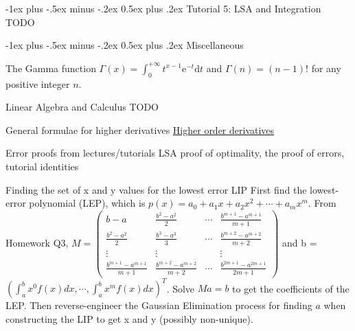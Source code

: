 \documentclass[10pt,landscape]{article}
\makeatletter
\renewcommand{\section}{\@startsection{section}{1}{0mm}%
                                {-1ex plus -.5ex minus -.2ex}%
                                {0.5ex plus .2ex}%
                                {\normalfont\large\bfseries}}
\theoremstyle{definition}
\newcommand{\thistheoremname}{}
\newtheorem*{genericthm*}{\thistheoremname}
\newenvironment{namedthm*}[1]
{\renewcommand{\thistheoremname}{#1}\begin{genericthm*}}
{\end{genericthm*}}
\makeatother
\begin{document}
\begin{multicols}{3}
	\section{Tutorial 5: LSA and Integration}
	\color{red} TODO \color{black}

	\section{Miscellaneous}
	\begin{namedthm*}{The Gamma function} \(\Gamma(x)=\int_{0}^{+\infty} t^{x-1} \mathrm{e}^{-t} \mathrm{d} t\) and \(\Gamma(n)=(n-1) !\) for any positive integer \(n\).
	\end{namedthm*}
	\begin{namedthm*}{Linear Algebra and Calculus}
		\color{red} TODO
	\end{namedthm*}
	\begin{namedthm*}{General formulae for higher derivatives}
		\hyperref{https://www.math24.net/higher-order-derivatives/}{}{}{Higher order derivatives}
	\end{namedthm*}
	\begin{namedthm*}{Error proofs from lectures/tutorials}
		\color{red} LSA proof of optimality, the proof of errors, tutorial identities
	\end{namedthm*}
	\begin{namedthm*}{Finding the set of x and y values for the lowest error LIP}
		First find the lowest-error polynomial (LEP), which is \(p(x)=a_{0}+a_{1} x+a_{2} x^{2}+\cdots+a_{m} x^{m}\). From Homework Q3, \(M=\left(\begin{array}{cccc}{b-a} & {\frac{b^{2}-a^{2}}{2}} & {\cdots} & {\frac{b^{m+1}-a^{m+1}}{m+1}} \\ {\frac{b^{2}-a^{2}}{2}} & {\frac{b^{3}-a^{3}}{3}} & {\cdots} & {\frac{b^{m+2}-a^{m+2}}{m+2}} \\ {\vdots} & {\vdots} & {} & {\vdots} \\ {\frac{b^{m+1}-a^{m+1}}{m+1}} & {\frac{b^{m+2}-a^{m+2}}{m+2}} & {\cdots} & {\frac{b^{2 m+1}-a^{2 m+1}}{2 m+1}}\end{array}\right)\) and b = \(\left(\int_{a}^{b} x^{0} f(x) d x, \cdots, \int_{a}^{b} x^{m} f(x) d x\right)^{T}\). Solve \(Ma = b\) to get the coefficients of the LEP. Then reverse-engineer the Gaussian Elimination process for finding \(a\) when constructing the LIP to get x and y (possibly non-unique).
	\end{namedthm*}

\end{multicols}
\end{document}
